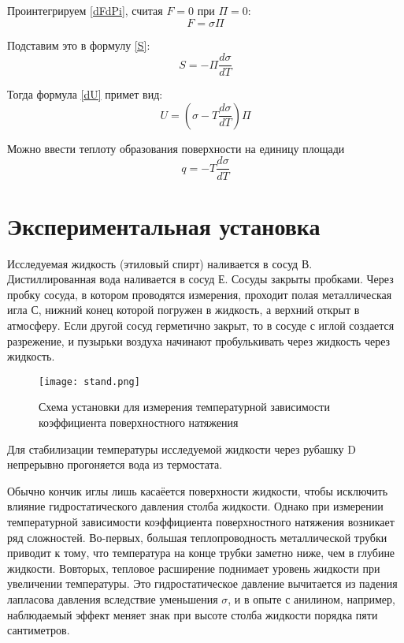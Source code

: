 \documentclass[12pt]{article}
\begin{document}
    Проинтегрируем \ref{dFdPi}, считая $F = 0$ при $\Pi = 0$:
    \begin{equation}
        F = \sigma \Pi
    \end{equation}

    Подставим это в формулу \ref{S}:
    \begin{equation}
        S = -\Pi \frac{d\sigma}{dT}
    \end{equation}

    Тогда формула \ref{dU} примет вид:
    \begin{equation}
        U = \left(\sigma - T\frac{d\sigma}{dT}\right)\Pi
        \label{U}
    \end{equation}

    Можно ввести теплоту образования поверхности на единицу площади
    \begin{equation}
        q = -T\frac{d\sigma}{dT}
        \label{q}
    \end{equation}

    \section{Экспериментальная установка}
    Исследуемая жидкость (этиловый спирт) наливается в сосуд В.
    Дистиллированная вода наливается в сосуд Е. Сосуды закрыты пробками. Через
    пробку сосуда, в котором проводятся измерения, проходит полая металлическая игла
    С, нижний конец которой погружен в жидкость, а верхний открыт в атмосферу. Если
    другой сосуд герметично закрыт, то в сосуде с иглой создается разрежение,
    и пузырьки воздуха начинают пробулькивать через жидкость через жидкость.

    \begin{figure}[H]
        \centering
        \texttt{[image: stand.png]}
        \caption{
        Схема установки для измерения температурной зависимости
        коэффициента поверхностного натяжения
        }
    \end{figure}
    Для стабилизации температуры исследуемой жидкости через рубашку D непрерывно
    прогоняется вода из термостата.

    Обычно кончик иглы лишь касаёется поверхности жидкости, чтобы исключить
    влияние гидростатического давления столба жидкости. Однако при измерении
    температурной зависимости коэффициента поверхностного натяжения возникает
    ряд сложностей. Во-первых, большая теплопроводность металлической трубки
    приводит к тому, что температура на конце трубки заметно ниже, чем в глубине
    жидкости. Вовторых, тепловое расширение поднимает уровень жидкости при
    увеличении температуры. Это гидростатическое давление вычитается из падения
    лапласова давления вследствие уменьшения $\sigma$, и в опыте с анилином,
    например, наблюдаемый эффект меняет знак при высоте столба жидкости порядка
    пяти сантиметров.
\end{document}

